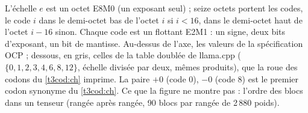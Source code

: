   {L'échelle $e$ est un octet E8M0 (un exposant seul) ; seize octets portent les codes, le code $i$ dans le demi-octet bas de l'octet $i$ si $i < 16$, dans le demi-octet haut de l'octet $i-16$ sinon. Chaque code est un flottant E2M1 : un signe, deux bits d'exposant, un bit de mantisse. Au-dessus de l'axe, les valeurs de la spécification OCP ; dessous, en gris, celles de la table doublée de llama.cpp ($\{0,1,2,3,4,6,8,12\}$, échelle divisée par deux, mêmes produits), que la roue des codons du \cref{t3cod:ch} imprime. La paire $+0$ (code 0), $-0$ (code 8) est le premier codon synonyme du \cref{t3cod:ch}. Ce que la figure ne montre pas : l'ordre des blocs dans un tenseur (rangée après rangée, 90 blocs par rangée de 2\,880 poids).}

